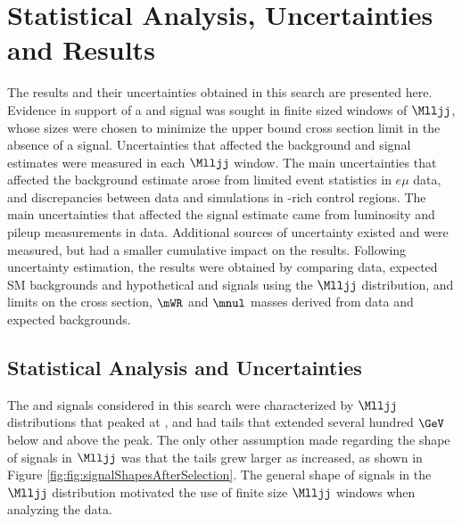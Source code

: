 \chapter{Statistical Analysis, Uncertainties and Results}
\label{statAnalysis_uncerts_results}
The results and their uncertainties obtained in this search are presented here.  Evidence in 
support of a \WR and \nul signal was sought in finite sized windows of $\Mlljj$, whose sizes 
were chosen to minimize the upper bound \WR cross section limit in the absence of a signal.  
Uncertainties that affected the background and signal estimates were measured in each $\Mlljj$ 
window.  The main uncertainties that affected the background estimate arose from limited event 
statistics in $e\mu$ data, and discrepancies between data and simulations in \DY-rich control 
regions.  The main uncertainties that affected the signal estimate came from luminosity and 
pileup measurements in data.  Additional sources of uncertainty existed and were measured, 
but had a smaller cumulative impact on the results.  Following uncertainty estimation, the 
results were obtained by comparing data, expected SM backgrounds and hypothetical 
\WR and \nul signals using the $\Mlljj$ distribution, and limits on the \WR cross section, 
$\mWR$ and $\mnul$ masses derived from data and expected backgrounds.

\section{Statistical Analysis and Uncertainties}
\label{sec:massWindows_uncertainties}
The \WR and \nul signals considered in this search were characterized by $\Mlljj$ distributions 
that peaked at \mWR, and had tails that extended several hundred $\GeV$ below and above the 
peak.  The only other assumption made regarding the shape of signals in $\Mlljj$ was that 
the tails grew larger as \mWR increased, as shown in Figure \ref{fig:fig:signalShapesAfterSelection}.  
The general shape of \WR signals in the $\Mlljj$ distribution motivated the use of finite 
size $\Mlljj$ windows when analyzing the data.

